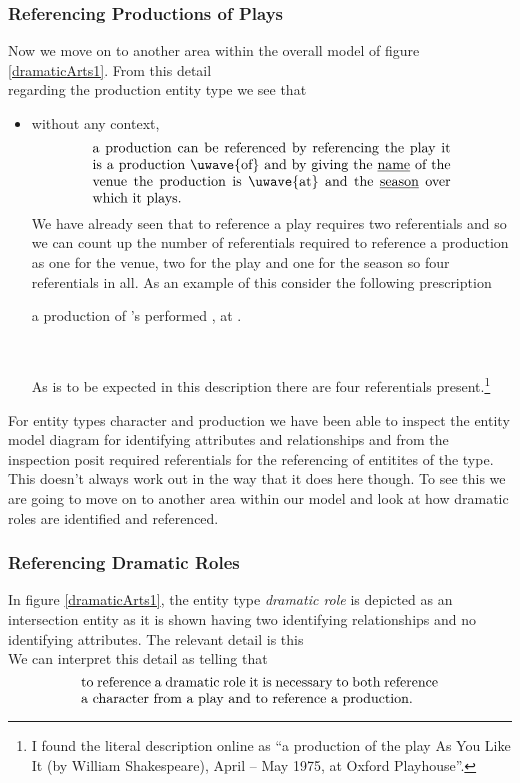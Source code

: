 \subsubsection{Referencing Productions of Plays}
Now we move on to another area within the overall model of figure \ref{dramaticArts1}. From this detail 
\begin{equation*}

\end{equation*}
regarding the production entity type  we see that
\begin{itemize}
  \item
  without any context, 
  \begin{equation} 
\label{absoluteCharacterReferencing}
\text{\parbox{9cm}{a production can be referenced by referencing the play it is a production \uwave{of} 
  and by giving the \underline{name} of the venue  the production is \uwave{at} and the \underline{season} 
  over which it plays.}}
\end{equation}
We have already seen that to reference a play requires two referentials and so
we can count up the number of referentials required to reference a production
  as one for the venue, two for the play and one for the season so four referentials in all. 
As an example of this consider the following prescription
\begin{erquote}
\parbox{9cm}{a production of \mbox{'s} 
 performed \mbox{,} at .}\\
\end{erquote}
As is to be expected in this description there are four referentials present.\footnote{
I found the literal description online as ``a production of the play As You Like It (by William Shakespeare), April – May 1975, at Oxford Playhouse''.  
} 
\end{itemize}
For entity types character and production we have been able to inspect the entity model diagram for identifying  attributes and relationships and from the inspection posit required referentials  for the referencing of entitites of the type.
This doesn't always work out in the way that it does here though. 
To see this we are going to move on to another area within our model and look at how dramatic roles are identified and referenced.
 \subsubsection{Referencing Dramatic Roles}
\mynote
In figure \ref{dramaticArts1}, the entity type \textit{dramatic role} is
depicted as an intersection entity as it is shown having
two identifying relationships and no identifying attributes.
The relevant detail is  this
\begin{equation*}

\end{equation*}
We can interpret this detail as telling that
\begin{equation}
\label{DramaticRoleReferencing}
\text{\parbox{9cm}{to reference a dramatic role it is necessary  
to both reference a character from a play and to reference a production.}}
\end{equation}

